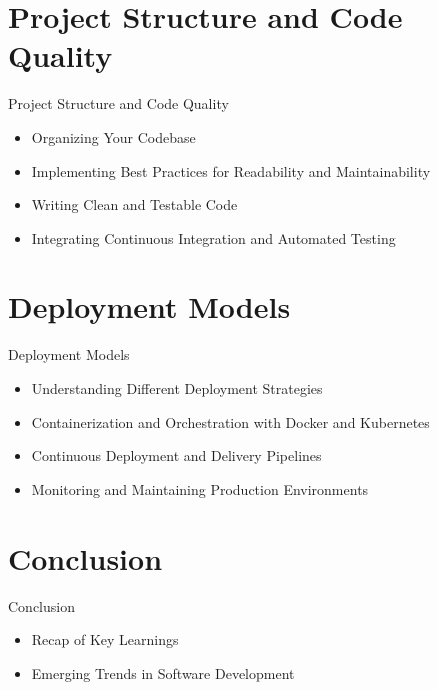\documentclass{beamer}
\begin{document}
\section{Project Structure and Code Quality}
\begin{frame}{Project Structure and Code Quality}
	\begin{itemize}
		\item Organizing Your Codebase
		\item Implementing Best Practices for Readability and Maintainability
		\item Writing Clean and Testable Code
		\item Integrating Continuous Integration and Automated Testing
	\end{itemize}
\end{frame}

\section{Deployment Models}
\begin{frame}{Deployment Models}
	\begin{itemize}
		\item Understanding Different Deployment Strategies
		\item Containerization and Orchestration with Docker and Kubernetes
		\item Continuous Deployment and Delivery Pipelines
		\item Monitoring and Maintaining Production Environments
	\end{itemize}
\end{frame}

\section{Conclusion}
\begin{frame}{Conclusion}
	\begin{itemize}
		\item Recap of Key Learnings
		\item Emerging Trends in Software Development
	\end{itemize}
\end{frame}
\end{document}
